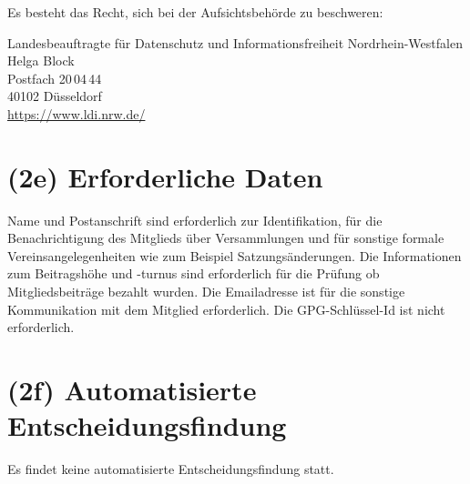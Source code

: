 \documentclass{article}
\begin{document}
Es besteht das Recht, sich bei der Aufsichtsbehörde zu beschweren:

\medskip
Landesbeauftragte für Datenschutz und Informationsfreiheit Nordrhein-Westfalen\\
Helga Block\\
Postfach 20\,04\,44\\
40102 Düsseldorf\\ 
\url{https://www.ldi.nrw.de/}


\section*{(2e) Erforderliche Daten}

Name und Postanschrift sind erforderlich zur Identifikation, für die
Benachrichtigung des Mitglieds über Versammlungen und für sonstige
formale Vereinsangelegenheiten wie zum Beispiel Satzungsänderungen.
%
Die Informationen zum Beitragshöhe und -turnus sind erforderlich
für die Prüfung ob Mitgliedsbeiträge bezahlt wurden.
%
Die Emailadresse ist für die sonstige Kommunikation mit dem Mitglied
erforderlich.
%
Die GPG-Schlüssel-Id ist nicht erforderlich.


\section*{(2f) Automatisierte Entscheidungsfindung}

Es findet keine automatisierte Entscheidungsfindung statt.
\end{document}
